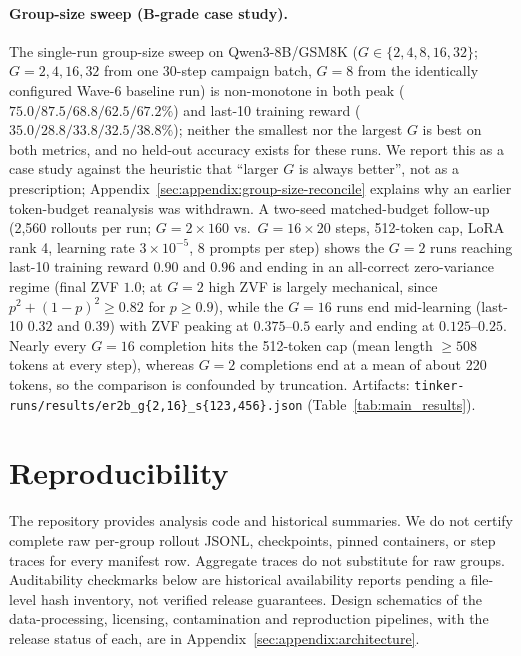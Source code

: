 \documentclass{article}
\begin{document}
\paragraph{Group-size sweep (B-grade case study).}
The single-run group-size sweep on Qwen3-8B/GSM8K ($G\in\{2,4,8,16,32\}$;
$G{=}2,4,16,32$ from one 30-step campaign batch, $G{=}8$ from the identically
configured Wave-6 baseline run) is non-monotone in both peak
($75.0/87.5/68.8/62.5/67.2\%$) and last-10 training reward
($35.0/28.8/33.8/32.5/38.8\%$); neither the smallest nor the largest $G$ is best
on both metrics, and no held-out accuracy exists for these runs. We report
this as a case study against the heuristic that ``larger $G$ is always
better'', not as a prescription; Appendix~\ref{sec:appendix:group-size-reconcile}
explains why an earlier token-budget reanalysis was withdrawn. A two-seed
matched-budget follow-up (2{,}560 rollouts per run;
$G{=}2\times160$ vs.\ $G{=}16\times20$ steps, 512-token cap, LoRA rank 4,
learning rate $3{\times}10^{-5}$, 8 prompts per step) shows the
$G{=}2$ runs reaching last-10 training reward $0.90$ and $0.96$ and ending
in an all-correct zero-variance regime (final ZVF $1.0$; at $G{=}2$ high
ZVF is largely mechanical, since $p^2+(1-p)^2\ge0.82$ for $p\ge0.9$), while the $G{=}16$
runs end mid-learning (last-10 $0.32$ and $0.39$) with ZVF peaking at
$0.375$--$0.5$ early and ending at $0.125$--$0.25$. Nearly every $G{=}16$
completion hits the 512-token cap (mean length $\ge508$ tokens at every
step), whereas $G{=}2$ completions end at a mean of about 220 tokens, so the
comparison is confounded by truncation. Artifacts:
\texttt{tinker-runs/results/er2b\_g\{2,16\}\_s\{123,456\}.json}
(Table~\ref{tab:main_results}).

\section{Reproducibility}
\label{sec:reproducibility}

The repository provides analysis code and historical summaries. We do not
certify complete raw per-group rollout JSONL, checkpoints, pinned containers,
or step traces for every manifest row. Aggregate traces do not substitute
for raw groups. Auditability checkmarks below are historical availability
reports pending a file-level hash inventory, not verified release guarantees.
Design schematics of the data-processing, licensing, contamination and
reproduction pipelines, with the release status of each, are in
Appendix~\ref{sec:appendix:architecture}.
\end{document}
